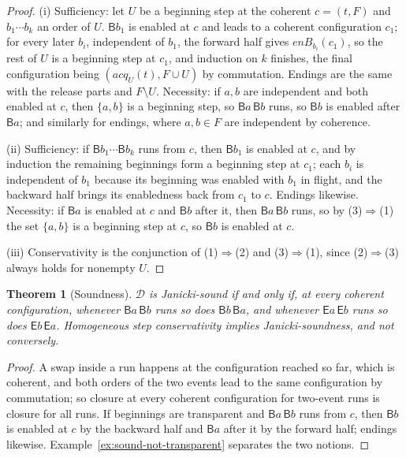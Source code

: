 \documentclass[preprint,12pt]{elsarticle}
\theoremstyle{plain}
\newtheorem{theorem}{Theorem}[section]
\theoremstyle{definition}
\newcommand{\acq}{\mathit{acq}}
\newcommand{\B}[1]{\mathsf{B}#1}
\newcommand{\E}[1]{\mathsf{E}#1}
\newcommand{\D}{\mathcal{D}}
\newcommand{\enB}[2]{\mathit{enB}_{#1}(#2)}
\begin{document}
\begin{proof}
(i) Sufficiency: let $U$ be a beginning step at the coherent $c = (t, F)$ and $b_1 \cdots b_k$ an order of $U$. $\B{b_1}$ is enabled at $c$ and leads to a coherent configuration $c_1$; for every later $b_i$, independent of $b_1$, the forward half gives $\enB{b_i}{c_1}$, so the rest of $U$ is a beginning step at $c_1$, and induction on $k$ finishes, the final configuration being $(\acq_U(t), F \cup U)$ by commutation. Endings are the same with the release parts and $F \setminus U$. Necessity: if $a, b$ are independent and both enabled at $c$, then $\{a, b\}$ is a beginning step, so $\B{a}\,\B{b}$ runs, so $\B{b}$ is enabled after $\B{a}$; and similarly for endings, where $a, b \in F$ are independent by coherence.

(ii) Sufficiency: if $\B{b_1} \cdots \B{b_k}$ runs from $c$, then $\B{b_1}$ is enabled at $c$, and by induction the remaining beginnings form a beginning step at $c_1$; each $b_i$ is independent of $b_1$ because its beginning was enabled with $b_1$ in flight, and the backward half brings its enabledness back from $c_1$ to $c$. Endings likewise. Necessity: if $\B{a}$ is enabled at $c$ and $\B{b}$ after it, then $\B{a}\,\B{b}$ runs, so by (3)$\Rightarrow$(1) the set $\{a, b\}$ is a beginning step at $c$, so $\B{b}$ is enabled at $c$.

(iii) Conservativity is the conjunction of (1)$\Rightarrow$(2) and (3)$\Rightarrow$(1), since (2)$\Rightarrow$(3) always holds for nonempty $U$.
\end{proof}

\begin{theorem}[Soundness]
\label{thm:B-sound}
$\D$ is Janicki-sound if and only if, at every coherent configuration, whenever $\B{a}\,\B{b}$ runs so does $\B{b}\,\B{a}$, and whenever $\E{a}\,\E{b}$ runs so does $\E{b}\,\E{a}$. Homogeneous step conservativity implies Janicki-soundness, and not conversely.
\end{theorem}

\begin{proof}
A swap inside a run happens at the configuration reached so far, which is coherent, and both orders of the two events lead to the same configuration by commutation; so closure at every coherent configuration for two-event runs is closure for all runs. If beginnings are transparent and $\B{a}\,\B{b}$ runs from $c$, then $\B{b}$ is enabled at $c$ by the backward half and $\B{a}$ after it by the forward half; endings likewise. Example~\ref{ex:sound-not-transparent} separates the two notions.
\end{proof}
\end{document}
